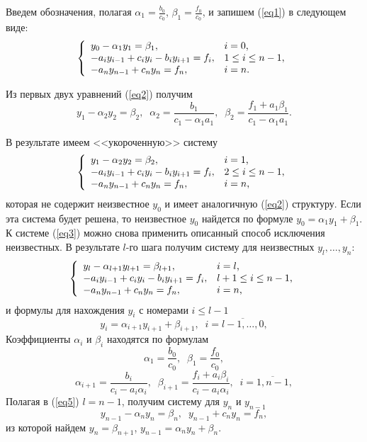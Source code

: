 \documentclass[
11pt,
master, %
subf, %
href, %
colorlinks=true, %
times, %
]{disser}
\begin{document}
Введем обозначения, полагая $\alpha_1 = \frac{b_0}{c_0}$, $\beta_1 = \frac{f_0}{c_0}$, и запишем (\ref{eq1}) в следующем виде:
\begin{equation}\label{eq2}
\left\{
  \begin{array}{ll}
    y_0 - \alpha_1 y_1 = \beta_1, & \hbox{$i = 0$,} \\
    -a_i y_{i-1} + c_i y_i - b_i y_{i+1} = f_i, & \hbox{$1 \leq i \leq n - 1$,} \\
    -a_n y_{n-1} + c_n y_n = f_n, & \hbox{$i = n$.}
  \end{array}
\right.
\end{equation}

Из первых двух уравнений (\ref{eq2}) получим
$$y_1 - \alpha_2 y_2 = \beta_2,\;\;\alpha_2 = \frac{b_1}{c_1 - \alpha_1 a_1},\;\;\beta_2 = \frac{f_1 + a_1 \beta_1}{c_1 - \alpha_1 a_1}.$$

В результате имеем <<укороченную>> систему
\begin{equation}\label{eq3}
\left\{
  \begin{array}{ll}
    y_1 - \alpha_2 y_2 = \beta_2, & \hbox{$i = 1$,} \\
    -a_i y_{i-1} + c_i y_i - b_i y_{i+1} = f_i, & \hbox{$2 \leq i \leq n - 1$,} \\
    -a_n y_{n-1} + c_n y_n = f_n, & \hbox{$i = n$,}
  \end{array}
\right.
\end{equation}
которая не содержит неизвестное $y_0$ и имеет аналогичную (\ref{eq2}) структуру. Если эта система будет решена, то неизвестное $y_0$ найдется по формуле $y_0 = \alpha_1 y_1 + \beta_1$. К системе (\ref{eq3}) можно снова применить описанный способ исключения неизвестных. В результате $l$-го шага получим систему для неизвестных $y_l,\ldots, y_n$:
\begin{equation}\label{eq4}
\left\{
  \begin{array}{ll}
    y_l - \alpha_{l+1} y_{l+1} = \beta_{l+1}, & \hbox{$i = l$,} \\
    -a_i y_{i-1} + c_i y_i - b_i y_{i+1} = f_i, & \hbox{$l+1 \leq i \leq n - 1$,} \\
    -a_n y_{n-1} + c_n y_n = f_n, & \hbox{$i = n$,}
  \end{array}
\right.
\end{equation}
и формулы для нахождения $y_i$ с номерами $i \leq l-1$
\begin{equation}\label{eq5}
    y_i = \alpha_{i+1} y_{i+1} + \beta_{i+1},\;\;i = \overline{l-1,\ldots,0},
\end{equation}
Коэффициенты $\alpha_i$ и $\beta_i$ находятся по формулам
$$\alpha_1 = \frac{b_0}{c_0},\;\;\beta_1 = \frac{f_0}{c_0},$$
$$\alpha_{i+1} = \frac{b_i}{c_i - a_i \alpha_i},\;\;\beta_{i+1} = \frac{f_i + a_i \beta_i}{c_i - a_i \alpha_i},\;\;i = \overline{1, n-1},$$
Полагая в (\ref{eq5}) $l = n - 1$, получим систему для $y_n$ и $y_{n-1}$
$$y_{n-1} - \alpha_n y_n = \beta_n,\;\; y_{n-1} + c_n y_n = f_n,$$
из которой найдем $y_n = \beta_{n+1}$, $y_{n-1} = \alpha_n y_n + \beta_n$.
\end{document}
